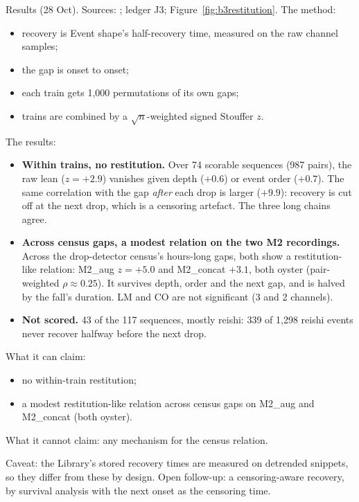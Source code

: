 \begin{instructions}
Results (28 Oct). Sources: ; ledger J3;
Figure~\ref{fig:b3restitution}. The method:
\begin{itemize}
  \item recovery is Event shape's half-recovery time, measured on the raw channel samples;
  \item the gap is onset to onset;
  \item each train gets 1,000 permutations of its own gaps;
  \item trains are combined by a $\sqrt{n}$-weighted signed Stouffer $z$.
\end{itemize}
The results:
\begin{itemize}
  \item \textbf{Within trains, no restitution.} Over 74 scorable sequences (987 pairs), the raw lean ($z=+2.9$)
        vanishes given depth ($+0.6$) or event order ($+0.7$). The same correlation with the gap \emph{after} each
        drop is larger ($+9.9$): recovery is cut off at the next drop, which is a censoring artefact. The three long
        chains agree.
  \item \textbf{Across census gaps, a modest relation on the two M2 recordings.} Across the drop-detector census's
        hours-long gaps, both show a restitution-like relation: M2\_aug $z=+5.0$ and M2\_concat $+3.1$, both oyster (pair-weighted
        $\rho\approx0.25$). It survives depth, order and the next gap, and is halved by the fall's duration. LM and
        CO are not significant (3 and 2 channels).
  \item \textbf{Not scored.} 43 of the 117 sequences, mostly reishi: 339 of 1,298 reishi events never recover halfway
        before the next drop.
\end{itemize}

What it can claim:
\begin{itemize}
  \item no within-train restitution;
  \item a modest restitution-like relation across census gaps on M2\_aug and M2\_concat (both oyster).
\end{itemize}
What it cannot claim: any mechanism for the census relation.

Caveat: the Library's stored recovery times are measured on detrended snippets, so they differ from these by design.
Open follow-up: a censoring-aware recovery, by survival analysis with the next onset as the censoring time.
\end{instructions}

